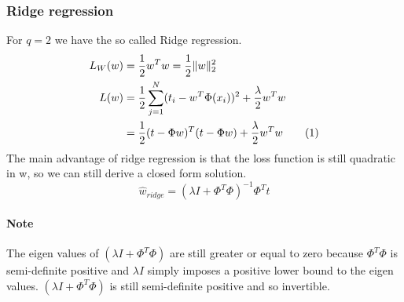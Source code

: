 \documentclass[main.tex]{subfiles}
\newcommand\numberthis{\addtocounter{equation}{1}\tag{\theequation}}
\begin{document}
\subsubsection{Ridge regression}
For $q=2$ we have the so called Ridge regression.
\begin{align*}
    L_W(w)&=\frac{1}{2}w^T w = \frac{1}{2}\| w \|_2^2 \\
    L(w) &= \frac{1}{2}\sum_{j=1}^N(t_i-w^T\Phi(x_i))^2 + \frac{\lambda}{2}w^T w \\
    &=\frac{1}{2}(t-\Phi w)^T(t-\Phi w) + \frac{\lambda}{2}w^T w \numberthis
\end{align*}
The main advantage of ridge regression is that the loss function is still quadratic in w, so we can still derive a closed form solution.
\begin{equation}
    \hat{w}_{ridge}=(\lambda I+\Phi^T \Phi)^{-1}\Phi^T t
\end{equation}
\paragraph{Note} The eigen values of $(\lambda I+\Phi^T \Phi)$ are still greater or equal to zero because $\Phi^T \Phi$ is semi-definite positive and $\lambda I$ simply imposes a positive lower bound to the eigen values. $(\lambda I+\Phi^T \Phi)$ is still semi-definite positive and so invertible.
\end{document}
